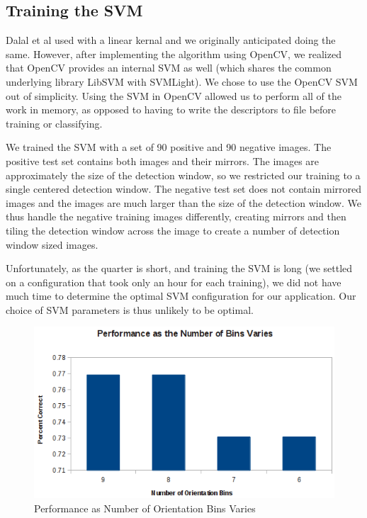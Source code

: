 \documentclass[a4paper,11pt]{article}
\begin{document}
\begin{multicols}{2}
\section{Training the SVM}
Dalal et al used with a linear kernal and we originally anticipated doing the same.
However, after implementing the algorithm using OpenCV, we realized that OpenCV provides an internal 
SVM as well (which shares the common underlying library LibSVM with SVMLight). We chose 
to use the OpenCV SVM out of simplicity.  Using the SVM in OpenCV allowed us to perform all of the 
work in memory, as opposed to having to write the descriptors to file before training or classifying.

We trained the SVM with a set of 90 positive and 90 negative images.  The positive test set contains 
both images and their mirrors. The images are approximately the size of the detection window, 
so we restricted our training to a single centered detection window. The negative test set does not 
contain mirrored images and the images are much larger than the size of the detection window.  
We thus handle the negative training images differently, creating mirrors and then tiling the 
detection window across the image to create a number of detection window sized images.

Unfortunately, as the quarter is short, and training the SVM is long (we settled on 
a configuration that took only an hour for each training), we did not have 
much time to determine the optimal SVM configuration for our application.  
Our choice of SVM parameters is thus unlikely to be optimal.

\end{multicols}
\begin{figure}[t]
  \includegraphics[scale=0.75]{performance_vs_numbins.png}
  \caption{Performance as Number of Orientation Bins Varies}
  \label{NumBins-vs-Performance}
\end{figure}
\end{document}

